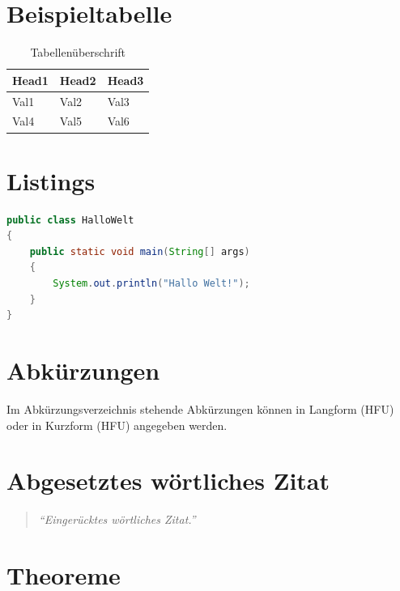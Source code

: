 \section{Beispieltabelle}

\begin{table}
\caption{Tabellenüberschrift}
\center
\footnotesize
\begin{tabular}{lll}
\toprule
Head1 & Head2 & Head3 \\
\midrule
Val1 & Val2 & Val3 \\
Val4 & Val5 & Val6 \\
\bottomrule
\end{tabular}
\end{table}

\section{Listings}

\begin{lstlisting}[language=java, breaklines=false, caption=Hallo Welt in Java]
public class HalloWelt 
{
	public static void main(String[] args) 
	{
		System.out.println("Hallo Welt!");
	}
}
\end{lstlisting}


\section{Abkürzungen}

Im Abkürzungsverzeichnis stehende Abkürzungen können in Langform (\acs{HFU}) oder in Kurzform (\acs{HFU}) angegeben werden.

\section{Abgesetztes wörtliches Zitat}

\lipsum[10]

\begin{quote}
\textit{\enquote{Eingerücktes wörtliches Zitat.}}\cite[S. 14ff]{s11wasml}
\end{quote}

\lipsum[10]

\section{Theoreme}

